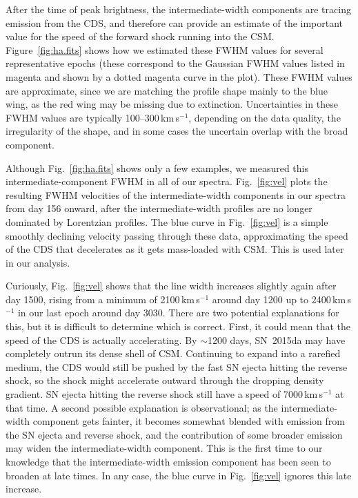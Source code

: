 \documentclass[fleqn,usenatbib,useAMS]{mnras}
\begin{document}
After the time of peak brightness, the intermediate-width components are tracing emission from the CDS, and therefore can provide an estimate of the important value
for the speed of the forward shock running into the CSM.
Figure~\ref{fig:ha.fits} shows how we estimated these FWHM values for
several representative epochs (these correspond to the Gaussian FWHM
values listed in magenta and shown by a dotted magenta curve in the
plot).   These FWHM values are approximate, since we are
matching the profile shape mainly to the blue wing, as the red wing
may be missing due to extinction.  Uncertainties in these FWHM values
are typically 100--300\,km\,s$^{-1}$, depending on the data quality, the
irregularity of the shape, and in some cases the uncertain overlap
with the broad component.

Although Fig.~\ref{fig:ha.fits} shows only a few examples, we
measured this intermediate-component FWHM in all of our spectra.
Fig.~\ref{fig:vel} plots the resulting FWHM velocities of the
intermediate-width components in our spectra from day 156 onward,
after the intermediate-width profiles are no longer dominated by
Lorentzian profiles.  The blue curve in Fig.~\ref{fig:vel} is a
simple smoothly declining velocity passing through these data,
approximating the speed of the CDS that decelerates as it gets
mass-loaded with CSM.  This is used later in our analysis.

Curiously, Fig.~\ref{fig:vel} shows that the line width increases
slightly again after day 1500, rising from a minimum of 2100\,km\,s$^{-1}$ around day 1200 up to 2400\,km\,s$^{-1}$ in our last epoch
around day 3030.  There are two potential explanations for this, but it is difficult to determine which is correct.
First, it could mean that the speed of the CDS is actually
accelerating.  By $\sim$1200 days, SN~2015da may have completely outrun
its dense shell of CSM.  Continuing to expand into a rarefied medium,
the CDS would still be pushed by the fast SN ejecta hitting the
reverse shock, so the shock might accelerate outward through the dropping
density gradient.  SN ejecta hitting the reverse shock still have a speed of 7000\,km\,s$^{-1}$
at that time.  A second possible explanation is observational; as
the intermediate-width component gets fainter, it becomes somewhat
blended with emission from the SN ejecta and reverse shock, and
 the contribution of some broader emission may widen the intermediate-width
component.  This is the first time to our knowledge
that the intermediate-width emission component has been seen to
broaden at late times.  In any case, the blue curve in Fig.~\ref{fig:vel} ignores this late increase.
\end{document}
